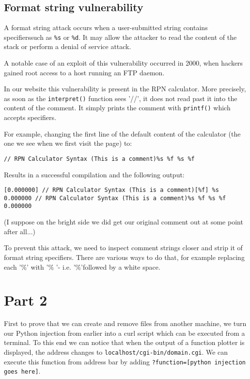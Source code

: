 \documentclass[11pt,journal]{article}
\begin{document}
	\subsection{Format string vulnerability}
	A format string attack occurs when a user-submitted string contains specifierssuch as \texttt{\%s} or \texttt{\%d}. It may allow the attacker to read the content of the stack or perform a denial of service attack.
	
	A notable case of an exploit of this vulnerability occurred in 2000, when hackers gained root access to a host running an FTP daemon\cite{format string}.
	
	In our website this vulnerability is present in the RPN calculator. More precisely, as soon as the \texttt{interpret()} function sees '//', it does not read past it into the content of the comment. It simply prints the comment with \texttt{printf()} which accepts specifiers.
	
	For example, changing the first line of the default content of the calculator (the one we see when we first visit the page) to:
	
	\texttt{// RPN Calculator Syntax (This is a comment)\%s \%f \%s \%f}
	
	Results in a successful compilation and the following output:
	
	\texttt{[0.000000] // RPN Calculator Syntax (This is a comment)[\%f] \%s 0.000000  // RPN Calculator Syntax (This is a comment)\%s \%f \%s \%f 0.000000}
	
	(I suppose on the bright side we did get our original comment out at some point after all...)
	
	To prevent this attack, we need to inspect comment strings closer and strip it of format string specifiers. There are various ways to do that, for example replacing each '\%' with '\% '- i.e. '\%'followed by a white space.
	
	
	
	\section{Part 2}
	
	First to prove that we can create and remove files from another machine, we turn our Python injection from earlier into a curl script which can be executed from a terminal. To this end we can notice that when the output of a function plotter is displayed, the address changes to \texttt{localhost/cgi-bin/domain.cgi}. We can execute this function from address bar by adding \texttt{?function=[python injection goes here]}.
	
\end{document}
